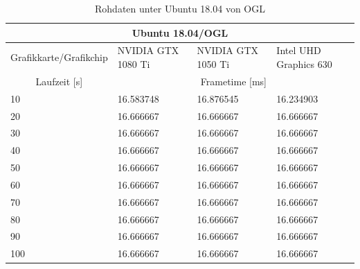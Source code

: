 \documentclass[titlepage, 11pt, a4paper, ngerman]{article}
\begin{document}
\begin{table}[ht]
    \centering
    \caption[Rohdaten unter Ubuntu 18.04 von OGL]{Rohdaten unter Ubuntu 18.04 von OGL}
    \bigbreak
    \begin{tabular}{|p{4cm}||p{2.5cm}|p{2.5cm}|p{3cm}|}
    \hline
    \multicolumn{4}{|c|}{Ubuntu 18.04/OGL} \\
    \hline
    Grafikkarte/Grafikchip & NVIDIA GTX 1080 Ti & NVIDIA GTX 1050 Ti & Intel UHD Graphics 630 \\
    \hline
    \hline
    \multicolumn{1}{|c||}{Laufzeit [s]} & \multicolumn{3}{|c|}{\gls{Frametime} [ms]} \\
    \hline
    10 & 16.583748 & 16.876545 & 16.234903 \\
    \hline
    20 & 16.666667 & 16.666667 & 16.666667 \\
    \hline
    30 & 16.666667 & 16.666667 & 16.666667 \\
    \hline
    40 & 16.666667 & 16.666667 & 16.666667 \\
    \hline
    50 & 16.666667 & 16.666667 & 16.666667 \\
    \hline
    60 & 16.666667 & 16.666667 & 16.666667 \\
    \hline
    70 & 16.666667 & 16.666667 & 16.666667 \\
    \hline
    80 & 16.666667 & 16.666667 & 16.666667 \\
    \hline
    90 & 16.666667 & 16.666667 & 16.666667 \\
    \hline
    100 & 16.666667 & 16.666667 & 16.666667 \\
    \hline
    \end{tabular}
    \label{Tab:results-raw-ubuntu-ogl}
\end{table}
\end{document}
